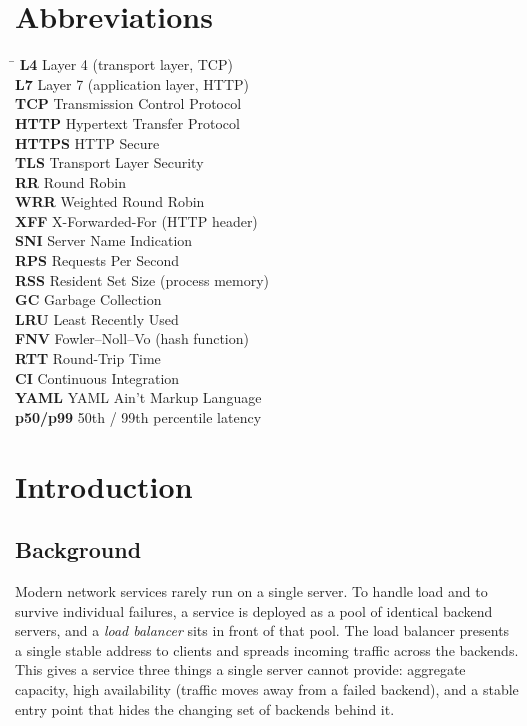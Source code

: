 \documentclass[11pt,a4paper]{report}
\begin{document}
\chapter*{Abbreviations}
\begin{tabbing}
\hspace{3cm}\= \kill
\textbf{L4} \> Layer 4 (transport layer, TCP)\\
\textbf{L7} \> Layer 7 (application layer, HTTP)\\
\textbf{TCP} \> Transmission Control Protocol\\
\textbf{HTTP} \> Hypertext Transfer Protocol\\
\textbf{HTTPS} \> HTTP Secure\\
\textbf{TLS} \> Transport Layer Security\\
\textbf{RR} \> Round Robin\\
\textbf{WRR} \> Weighted Round Robin\\
\textbf{XFF} \> X-Forwarded-For (HTTP header)\\
\textbf{SNI} \> Server Name Indication\\
\textbf{RPS} \> Requests Per Second\\
\textbf{RSS} \> Resident Set Size (process memory)\\
\textbf{GC} \> Garbage Collection\\
\textbf{LRU} \> Least Recently Used\\
\textbf{FNV} \> Fowler--Noll--Vo (hash function)\\
\textbf{RTT} \> Round-Trip Time\\
\textbf{CI} \> Continuous Integration\\
\textbf{YAML} \> YAML Ain't Markup Language\\
\textbf{p50/p99} \> 50th / 99th percentile latency\\
\end{tabbing}

\clearpage
{}
\chapter{Introduction}

\section{Background}
Modern network services rarely run on a single server. To handle load and to survive
individual failures, a service is deployed as a pool of identical backend servers, and a
\emph{load balancer} sits in front of that pool. The load balancer presents a single stable
address to clients and spreads incoming traffic across the backends. This gives a service
three things a single server cannot provide: aggregate capacity, high availability (traffic
moves away from a failed backend), and a stable entry point that hides the changing set of
backends behind it.
\end{document}
